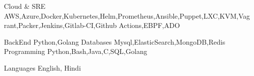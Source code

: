 

\begin{cvskills}

  \cvskill
    {Cloud & SRE} %
	{AWS,Azure,Docker,Kubernetes,Helm,Prometheus,Ansible,Puppet,LXC,KVM,Vagrant,Packer,Jenkins,Gitlab-CI,Github Actions,EBPF,ADO} %

  \cvskill
   {BackEnd} %
	{Python,Golang} %
  \cvskill
   {Databases} %
	{Mysql,ElasticSearch,MongoDB,Redis} %
  \cvskill
   {Programming} %
	{Python,Bash,Java,C,SQL,Golang} %

  \cvskill
    {Languages} %
	{English, Hindi} %

\end{cvskills}
